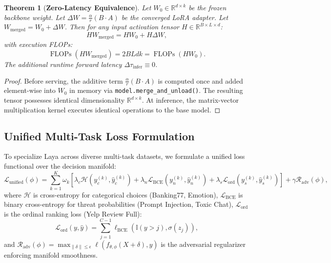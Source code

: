 \documentclass[10pt,journal,compsoc]{IEEEtran}
\newtheorem{theorem}{Theorem}
\theoremstyle{remark}
\begin{document}
\begin{theorem}[\textbf{Zero-Latency Equivalence}]
Let $W_0 \in \mathbb{R}^{d \times k}$ be the frozen backbone weight. Let $\Delta W = \frac{\alpha}{r} (B \cdot A)$ be the converged LoRA adapter. Let $W_{\text{merged}} = W_0 + \Delta W$. Then for any input activation tensor $H \in \mathbb{R}^{B \times L \times d}$:
\begin{equation}
H W_{\text{merged}} = H W_0 + H \Delta W,
\end{equation}
with execution FLOPs:
\begin{equation}
\operatorname{FLOPs}(H W_{\text{merged}}) = 2 B L d k = \operatorname{FLOPs}(H W_0).
\end{equation}
The additional runtime forward latency $\Delta \tau_{\text{infer}} \equiv 0$.
\end{theorem}
\begin{proof}
Before serving, the additive term $\frac{\alpha}{r} (B \cdot A)$ is computed once and added element-wise into $W_0$ in memory via \texttt{model.merge\_and\_unload()}. The resulting tensor possesses identical dimensionality $\mathbb{R}^{d \times k}$. At inference, the matrix-vector multiplication kernel executes identical operations to the base model.
\end{proof}

\subsection{Unified Multi-Task Loss Formulation}
To specialize Laya across diverse multi-task datasets, we formulate a unified loss functional over the decision manifold:
\begin{equation}
\label{eq:unified_loss}
\mathcal{L}_{\text{unified}}(\phi) = \sum_{k=1}^K \omega_k \left[ \lambda_c \mathcal{H}(y_c^{(k)}, \hat{y}_c^{(k)}) + \lambda_n \mathcal{L}_{\text{BCE}}(y_n^{(k)}, \hat{y}_n^{(k)}) + \lambda_s \mathcal{L}_{\text{ord}}(y_s^{(k)}, \hat{y}_s^{(k)}) \right] + \gamma \mathcal{R}_{\text{adv}}(\phi),
\end{equation}
where $\mathcal{H}$ is cross-entropy for categorical choices (Banking77, Emotion), $\mathcal{L}_{\text{BCE}}$ is binary cross-entropy for threat probabilities (Prompt Injection, Toxic Chat), $\mathcal{L}_{\text{ord}}$ is the ordinal ranking loss (Yelp Review Full):
\begin{equation}
\mathcal{L}_{\text{ord}}(y, \hat{y}) = \sum_{j=1}^{C-1} \ell_{\text{BCE}}\left(\mathbb{I}(y > j), \sigma(z_j)\right),
\end{equation}
and $\mathcal{R}_{\text{adv}}(\phi) = \max_{\|\delta\| \le \epsilon} \ell(f_{\theta, \phi}(X + \delta), y)$ is the adversarial regularizer enforcing manifold smoothness.
\end{document}
